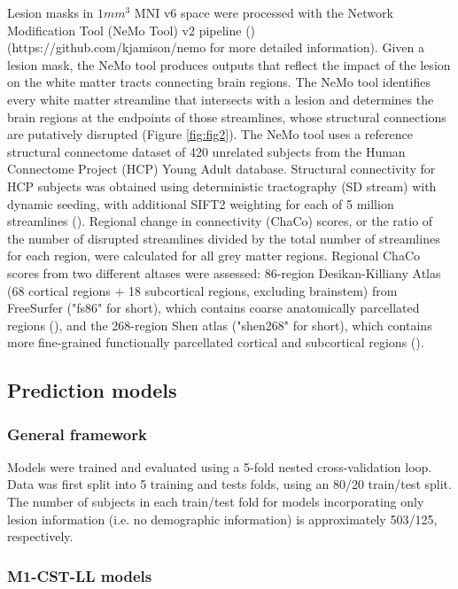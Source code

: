 \documentclass[10pt]{article}
\def\Plus{\texttt{+}}
\begin{document}
Lesion masks in $1mm^3$ MNI v6 space were processed with the Network Modification Tool (NeMo Tool) v2 pipeline (\cite{Kuceyeski2013-nk}) (https://github.com/kjamison/nemo for more detailed information). Given a lesion mask, the NeMo tool produces outputs that reflect the impact of the lesion on the white matter tracts connecting brain regions. The NeMo tool identifies every white matter streamline that intersects with a lesion and determines the brain regions at the endpoints of those streamlines, whose structural connections are putatively disrupted (Figure \ref{fig:fig2}). The NeMo tool uses a reference structural connectome dataset of 420 unrelated subjects from the Human Connectome Project (HCP) Young Adult database. Structural connectivity for HCP subjects was obtained using deterministic tractography (SD stream) with dynamic seeding, with additional SIFT2 weighting for each of 5 million streamlines (\cite{Smith2015-eb}). Regional change in connectivity (ChaCo) scores, or the ratio of the number of disrupted streamlines divided by the total number of streamlines for each region, were calculated for all grey matter regions. Regional ChaCo scores from two different altases were assessed: 86-region Desikan-Killiany Atlas (68 cortical regions $\Plus$ 18 subcortical regions, excluding brainstem) from FreeSurfer ("fs86" for short), which contains coarse anatomically parcellated regions (\cite{Desikan2006-vf,Fischl2002-lb}), and the 268-region Shen atlas ("shen268" for short), which contains more fine-grained functionally parcellated cortical and subcortical regions (\cite{Shen2013-zn}).


\subsection{Prediction models}
\subsubsection{General framework}

Models were trained and evaluated using a 5-fold nested cross-validation loop. Data was first split into 5 training and tests folds, using an 80/20 train/test split. The number of subjects in each train/test fold for models incorporating only lesion information (i.e. no demographic information) is approximately 503/125, respectively. 

\subsubsection{M1-CST-LL models}
\end{document}
